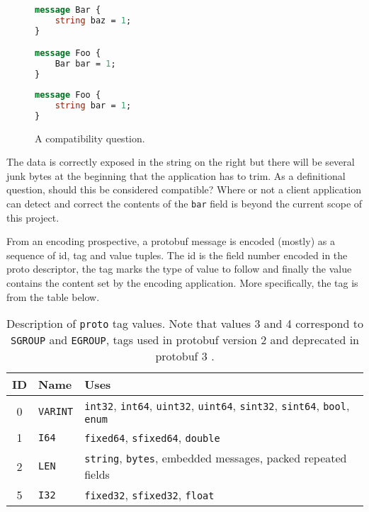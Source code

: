 \documentclass[11pt]{article}
\theoremstyle{definition}
\begin{document}
\begin{figure}[H]
	\centering
	\begin{minipage}[bt]{0.4\textwidth}
		\begin{lstlisting}[language=proto]
message Bar {
    string baz = 1;
}

message Foo {
    Bar bar = 1;
}\end{lstlisting}
	\end{minipage}
	\hspace{1cm}
	\begin{minipage}[bt]{0.4\textwidth}
		\begin{lstlisting}[language=proto]
message Foo {
    string bar = 1;
}\end{lstlisting}
	\end{minipage}

	\caption[]{A compatibility question.}
\end{figure}

The data is correctly exposed in the string on the right but there will be
several junk bytes at the beginning that the application has to trim. As a
definitional question, should this be considered compatible? Where or not a
client application can detect and correct the contents of the \texttt{bar} field
is beyond the current scope of this project.

From an encoding prospective, a protobuf message is encoded (mostly) as a
sequence of id, tag and value tuples. The id is the field number encoded in the
proto descriptor, the tag marks the type of value to follow and finally the
value contains the content set by the encoding application. More specifically,
the tag is from the table below.

\begin{table}[H]
	\centering
	\begin{tabular}{cll}
		\toprule
		ID & Name            & Uses                                                 \\
		\midrule
		0  & \texttt{VARINT} & \texttt{int32}, \texttt{int64}, \texttt{uint32},
		\texttt{uint64}, \texttt{sint32}, \texttt{sint64},
		\texttt{bool}, \texttt{enum}                                                \\
		1  & \texttt{I64}    & \texttt{fixed64}, \texttt{sfixed64}, \texttt{double} \\
		2  & \texttt{LEN}    & \texttt{string}, \texttt{bytes}, embedded messages,
		packed repeated fields                                                      \\
		5  & \texttt{I32}    & \texttt{fixed32}, \texttt{sfixed32},
		\texttt{float}                                                              \\
		\bottomrule
	\end{tabular}

	\vspace{4mm}
	\caption[]{Description of \texttt{proto} tag values. Note that values 3 and
		4 correspond to \texttt{SGROUP} and \texttt{EGROUP}, tags used in protobuf
		version 2 and deprecated in protobuf 3 \autocite{Encoding}.}
\end{table}
\end{document}
